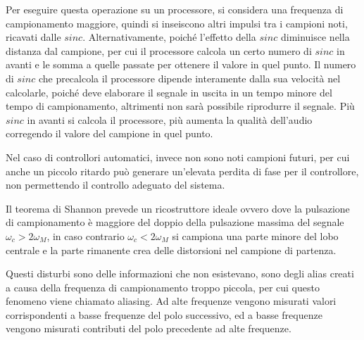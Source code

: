\documentclass{article}
\numberwithin{equation}{subsection}
\begin{document}
Per eseguire questa operazione su un 
processore, si considera una frequenza di campionamento maggiore, quindi si inseiscono altri impulsi tra i campioni noti, ricavati dalle $sinc$. Alternativamente, poiché 
l'effetto della $sinc$ diminuisce nella distanza dal campione, per cui il processore calcola un certo numero di $sinc$ in avanti e le somma a quelle passate per ottenere 
il valore in quel punto. Il numero di $sinc$ che precalcola il processore dipende interamente dalla sua velocità nel calcolarle, poiché deve elaborare il segnale in uscita 
in un tempo minore del tempo di campionamento, altrimenti non sarà possibile riprodurre il segnale. Più $sinc$ in avanti si calcola il 
processore, più aumenta la qualità dell'audio corregendo il valore del campione in quel punto. 

Nel caso di controllori automatici, invece non sono noti campioni futuri, per cui anche un piccolo ritardo può generare un'elevata perdita di fase per il controllore, 
non permettendo il controllo adeguato del sistema. 



Il teorema di Shannon prevede un ricostruttore ideale ovvero dove la pulsazione di campionamento è maggiore del doppio della pulsazione massima del segnale 
$\omega_c>2\omega_M$, in caso contrario $\omega_c<2\omega_M$ si campiona una parte minore del 
lobo centrale e la parte rimanente crea delle distorsioni nel campione di partenza. 


Questi disturbi sono delle informazioni che non esistevano, sono degli alias creati a causa 
della frequenza di campionamento troppo piccola, per cui questo fenomeno viene chiamato aliasing. Ad alte frequenze vengono misurati valori corrispondenti a basse 
frequenze del polo successivo, ed a basse frequenze vengono misurati contributi del polo precedente ad alte frequenze. 
\end{document}

